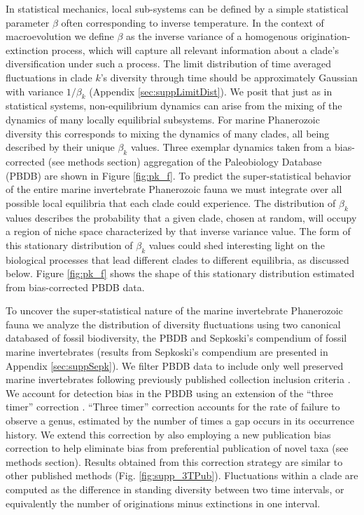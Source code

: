 \documentclass[12pt]{article}
\let\citep=\autocite
\begin{document}
In statistical mechanics, local sub-systems can be defined by a simple
statistical parameter $\beta$ often corresponding to inverse
temperature. In the context of macroevolution we define $\beta$ as the
inverse variance of a homogenous origination-extinction process, which
will capture all relevant information about a clade's diversification
under such a process.  The limit distribution of time averaged
fluctuations in clade $k$'s diversity through time should be
approximately Gaussian with variance $1/\beta_k$ (Appendix
\ref{sec:suppLimitDist}). We posit that just as in statistical
systems, non-equilibrium dynamics can arise from the mixing of the
dynamics of many locally equilibrial subsystems. For marine
Phanerozoic diversity this corresponds to mixing the dynamics of many
clades, all being described by their unique $\beta_k$ values.  Three
exemplar dynamics taken from a bias-corrected (see methods section)
aggregation of the Paleobiology Database (PBDB) \citep{alroy08} are
shown in Figure \ref{fig:pk_f}.
To predict the super-statistical behavior of the entire marine
invertebrate Phanerozoic fauna we must integrate over all possible
local equilibria that each clade could experience. The distribution of
$\beta_k$ values describes the probability that a given clade, chosen
at random, will occupy a region of niche space characterized by that
inverse variance value. The form of this stationary distribution of
$\beta_k$ values could shed interesting light on the biological
processes that lead different clades to different equilibria, as
discussed below.  Figure \ref{fig:pk_f} shows the shape of this
stationary distribution estimated from bias-corrected PBDB
\citep{alroy08} data.

To uncover the super-statistical nature of the marine invertebrate
Phanerozoic fauna we analyze the distribution of diversity
fluctuations using two canonical databased of fossil biodiversity, the
PBDB \citep{alroy08} and Sepkoski's compendium \citep{sepkoski1992} of
fossil marine invertebrates (results from Sepkoski's compendium are
presented in Appendix \ref{sec:suppSepk}).  We filter PBDB
data to include only well preserved marine invertebrates following
previously published collection inclusion criteria \citep{alroy08,
  alroy2010}.  We account for detection bias in the PBDB using an
extension of the ``three timer'' correction \citep{alroy08}. ``Three
timer'' correction accounts for the rate of failure to observe a
genus, estimated by the number of times a gap occurs in its occurrence
history. We extend this correction by also employing a new publication
bias correction to help eliminate bias from preferential publication
of novel taxa (see methods section). Results obtained from this
correction strategy are similar to other published methods
(Fig. \ref{fig:supp_3TPub}). Fluctuations within a clade are computed
as the difference in standing diversity between two time intervals, or
equivalently the number of originations minus extinctions in one
interval.
\end{document}
